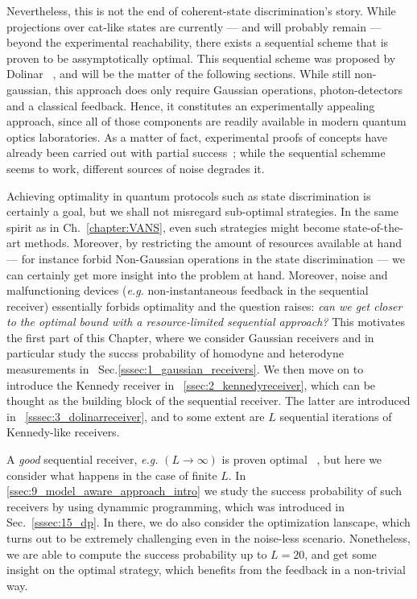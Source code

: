 Nevertheless, this is not the end of coherent-state discrimination's story. While projections over cat-like states are currently --- and will probably remain --- beyond the experimental reachability, there exists
a sequential scheme that is proven to be assymptotically optimal. This sequential scheme was proposed by Dolinar ~\cite{dolinar_phd}, and will be the matter of the following sections. While still non-gaussian, this approach does only require Gaussian operations, photon-detectors and a classical feedback. Hence, it constitutes an experimentally appealing approach, since all of those components are readily available in modern quantum optics laboratories. As a matter of fact, experimental proofs of concepts have already been carried out with partial success~\cite{exp_dols}; while the sequential schemme seems to work, different sources of noise degrades it.

Achieving optimality in quantum protocols such as state discrimination is certainly a goal, but we shall not misregard sub-optimal strategies. In the same spirit as in Ch.~\ref{chapter:VANS}, even such strategies might become state-of-the-art methods. Moreover, by restricting the amount of resources available at hand --- for instance forbid Non-Gaussian operations in the state discrimination --- we can certainly get more insight into the problem at hand. Moreover, noise and malfunctioning devices (\textit{e.g.} non-instantaneous feedback in the sequential receiver) essentially forbids optimality and the question raises: \textit{can we get closer to the optimal bound with a resource-limited sequential approach?} This motivates the first part of this Chapter, where we consider Gaussian receivers and in particular study the succss probability of homodyne and heterodyne measurements in ~Sec.\ref{sssec:1_gaussian_receivers}. We then move on to introduce the Kennedy receiver in ~\ref{ssec:2_kennedyreceiver}, which can be thought as the building block of the sequential receiver. The latter are introduced in ~\ref{sssec:3_dolinarreceiver},
and to some extent are $L$ sequential iterations of Kennedy-like receivers.

A \textit{good} sequential receiver, \textit{e.g.} $(L\rightarrow \infty)$ is proven optimal ~\cite{opti_dol}, but here we consider what happens in the case of finite $L$. In \ref{ssec:9_model_aware_approach_intro} we study the success probability of such receivers by using dynammic programming, which was introduced in Sec.~\ref{sssec:15_dp}. In there, we do also consider the optimization lanscape, which turns out to be extremely challenging even in the noise-less scenario. Nonetheless, we are able to compute the success probability up to $L=20$, and get some insight on the optimal strategy, which benefits from the feedback in a non-trivial way.

